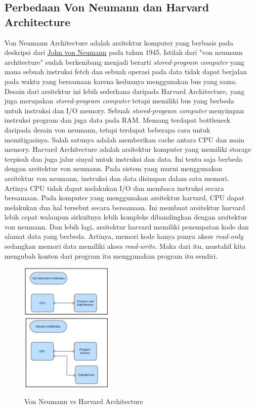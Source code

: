 \documentclass[a4paper,12pt]{article}
\begin{document}
\subsection{Perbedaan Von Neumann dan Harvard Architecture}
Von Neumann Architecture adalah arsitektur komputer yang berbasis pada deskripsi dari \href{https://en.wikipedia.org/wiki/John_von_Neumann}{John von Neumann} pada tahun 1945. Istilah dari "von neumann architecture" sudah berkembang menjadi berarti \textit{stored-program computer} yang mana sebuah instruksi fetch dan sebuah operasi pada data tidak dapat berjalan pada waktu yang bersamaan karena keduanya menggunakan bus yang sama. Desain dari arsitektur ini lebih sederhana daripada Harvard Architecture, yang juga merupakan \textit{stored-program computer} tetapi memiliki bus yang berbeda untuk instruksi dan I/O memory. Sebuah \textit{stored-program computer} menyimpan instruksi program dan juga data pada RAM. Memang terdapat bottleneck daripada desain von neumann, tetapi terdapat beberapa cara untuk memitigasinya. Salah satunya adalah memberikan cache antara CPU dan main memory. Harvard Architecture adalah arsitektur komputer yang memiliki storage terpisah dan juga jalur sinyal untuk instruksi dan data. Ini tentu saja berbeda dengan arsitektur von neumann. Pada sistem yang murni menggunakan arsitektur von neumann, instruksi dan data disimpan dalam satu memori. Artinya CPU tidak dapat melakukan I/O dan membaca instruksi secara bersamaan. Pada komputer yang menggunakan arsitektur harvard, CPU dapat melakukan dua hal tersebut secara bersamaan. Ini membuat arsitektur harvard lebih cepat walaupun sirkuitnya lebih kompleks dibandingkan dengan arsitektur von neumann. Dan lebih lagi, arsitektur harvard memiliki penempatan kode dan alamat data yang berbeda. Artinya, memori kode hanya punya akses \textit{read-only} sedangkan memori data memiliki akses \textit{read-write}. Maka dari itu, mustahil kita mengubah konten dari program itu menggunakan program itu sendiri.

\begin{figure}[H]
\centering
\includegraphics[width=0.4\textwidth]{neumann_vs_harvard.png}\\
\caption{Von Neumann vs Harvard Architecture}
\end{figure}
\end{document}
